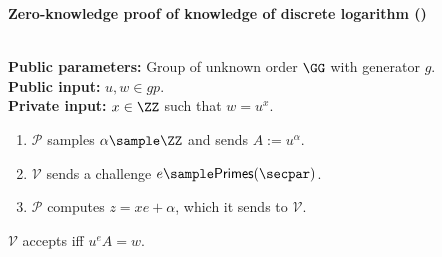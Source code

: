     \begin{mdframed}
    \begin{center}
        \textbf{Zero-knowledge proof of knowledge of discrete logarithm (\podlog)}
    \end{center}
    \hfill\\
    \textbf{Public parameters:} Group of unknown order $\GG$ with generator $g$. \hfill\\
    \textbf{Public input:} $u,w \in gp$. \hfill\\
    \textbf{Private input:} $x \in \ZZ$ such that $w = u^x$.
    \begin{enumerate}
        \item $\mathcal{P}$ samples $\alpha \sample \ZZ$ and sends $A := u^\alpha$.
        \item $\mathcal{V}$ sends a challenge $e \sample \mathsf{Primes}(\secpar)$.
        \item $\mathcal{P}$ computes $z = x e + \alpha$,
        which it sends to $\mathcal{V}$.
    \end{enumerate}
    $\mathcal{V}$ accepts iff $u^e A = w$.
    \end{mdframed}
